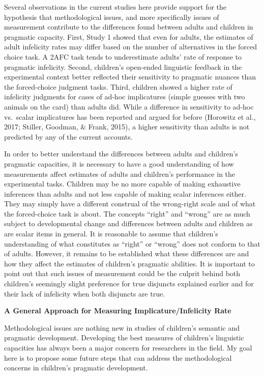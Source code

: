 \documentclass[oneside]{report}
\theoremstyle{definition}
\theoremstyle{definition}
\theoremstyle{definition}
\theoremstyle{remark}
\begin{document}
Several observations in the current studies here provide support for the
hypothesis that methodological issues, and more specifically issues of
measurement contribute to the differences found between adults and
children in pragmatic capacity. First, Study 1 showed that even for
adults, the estimates of adult infelicity rates may differ based on the
number of alternatives in the forced choice task. A 2AFC task tends to
underestimate adults' rate of response to pragmatic infelicity. Second,
children's open-ended linguistic feedback in the experimental context
better reflected their sensitivity to pragmatic nuances than the
forced-choice judgment tasks. Third, children showed a higher rate of
infelicity judgments for cases of ad-hoc implicatures (simple guesses
with two animals on the card) than adults did. While a difference in
sensitivity to ad-hoc vs.~scalar implicatures has been reported and
argued for before (Horowitz et al., 2017; Stiller, Goodman, \& Frank,
2015), a higher sensitivity than adults is not predicted by any of the
current accounts.

In order to better understand the differences between adults and
children's pragmatic capacities, it is necessary to have a good
understanding of how measurements affect estimates of adults and
children's performance in the experimental tasks. Children may be no
more capable of making exhaustive inferences than adults and not less
capable of making scalar inferences either. They may simply have a
different construal of the wrong-right scale and of what the
forced-choice task is about. The concepts ``right'' and ``wrong'' are as
much subject to developmental change and differences between adults and
children as are scalar items in general. It is reasonable to assume that
children's understanding of what constitutes as ``right'' or ``wrong''
does not conform to that of adults. However, it remains to be
established what these differences are and how they affect the estimates
of children's pragmatic abilities. It is important to point out that
such issues of measurement could be the culprit behind both children's
seemingly slight preference for true disjuncts explained earlier and for
their lack of infelicity when both disjuncts are true.

\textbf{A General Approach for Measuring Implicature/Infelicity Rate}

Methodological issues are nothing new in studies of children's semantic
and pragmatic development. Developing the best measures of children's
linguistic capacities has always been a major concern for researchers in
the field. My goal here is to propose some future steps that can address
the methodological concerns in children's pragmatic development.
\end{document}
